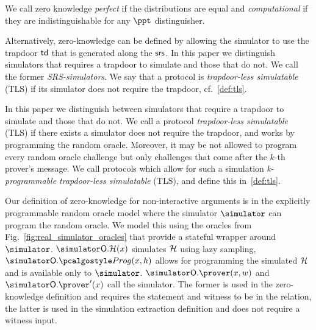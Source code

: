 We call zero knowledge \emph{perfect} if the distributions are equal and
\emph{computational} if they are indistinguishable for any $\ppt$ distinguisher.


Alternatively, zero-knowledge can be defined by allowing the simulator to use the
trapdoor $\mathsf{td}$ that is generated along the $\mathsf{srs}$. In this paper we distinguish
simulators that requires a trapdoor to simulate and those that do not. We call the
former \emph{SRS-simulators}. We say that a protocol is \emph{trapdoor-less
  simulatable} (TLS) if its simulator does not require the trapdoor, cf.~\cref{def:tls}.

\fi

In this paper we distinguish between simulators that require a trapdoor to simulate and those that do not. We call a protocol \emph{trapdoor-less
 simulatable} (TLS) if there exists a simulator does not require the trapdoor, and works by programming the random oracle.
 Moreover, it may be not allowed to program every random oracle challenge but only challenges that come after the $k$-th prover's message. We call protocols which allow for such a simulation $k$-\emph{programmable trapdoor-less simulatable} (TLS), and define this in~\cref{def:tls}.

 Our definition of zero-knowledge for non-interactive
arguments is in the explicitly programmable random oracle model where the simulator
$\simulator$ can program the random oracle. 
We model this using the oracles from Fig.~\ref{fig:real_simulator_oracles} that provide a stateful wrapper around $\simulator$.
$\simulator\oracleo.\ro (x)$ simulates $\mathcal{H}$ using lazy sampling, $\simulator\oracleo.\prog(x, h)$ allows for programming the simulated $\mathcal{H}$ and is available only to $\simulator$. $\simulator\oracleo.\prover(x, w)$ and $\simulator\oracleo.\prover'(x)$ call the simulator. The former is used in the zero-knowledge definition and requires the statement and witness to be in the relation, the latter is used in the simulation extraction definition and does not require a witness input.

